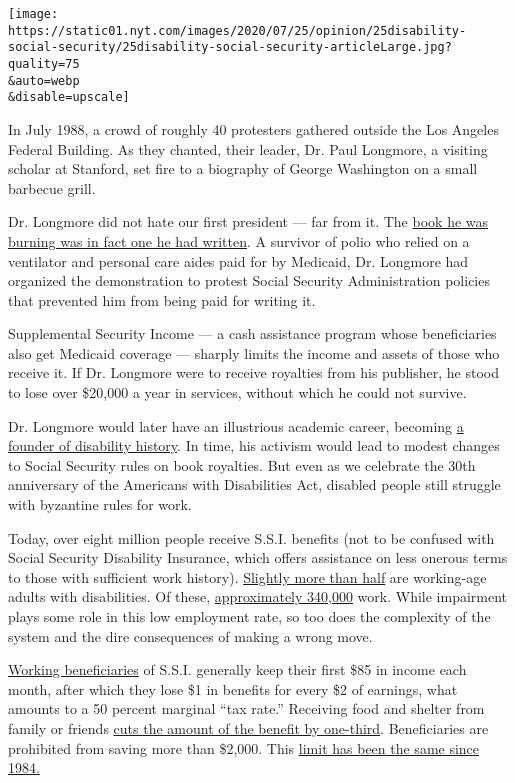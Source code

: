 \texttt{[image: https://static01.nyt.com/images/2020/07/25/opinion/25disability-social-security/25disability-social-security-articleLarge.jpg?quality=75\\\&auto=webp\\\&disable=upscale]}

In July 1988, a crowd of roughly 40 protesters gathered outside the Los
Angeles Federal Building. As they chanted, their leader, Dr. Paul
Longmore, a visiting scholar at Stanford, set fire to a biography of
George Washington on a small barbecue grill.

Dr. Longmore did not hate our first president --- far from it. The
\href{https://www.npr.org/sections/health-shots/2010/08/11/129127432/paul-longmore-historian-and-advocate-for-disabled-dies}{book
he was burning was in fact one he had written}. A survivor of polio who
relied on a ventilator and personal care aides paid for by Medicaid, Dr.
Longmore had organized the demonstration to protest Social Security
Administration policies that prevented him from being paid for writing
it.

Supplemental Security Income --- a cash assistance program whose
beneficiaries also get Medicaid coverage --- sharply limits the income
and assets of those who receive it. If Dr. Longmore were to receive
royalties from his publisher, he stood to lose over \$20,000 a year in
services, without which he could not survive.

Dr. Longmore would later have an illustrious academic career, becoming
\href{https://longmoreinstitute.sfsu.edu/paul-k-longmore}{a founder of
disability history}. In time, his activism would lead to modest changes
to Social Security rules on book royalties. But even as we celebrate the
30th anniversary of the Americans with Disabilities Act, disabled people
still struggle with byzantine rules for work.

Today, over eight million people receive S.S.I. benefits (not to be
confused with Social Security Disability Insurance, which offers
assistance on less onerous terms to those with sufficient work history).
\href{https://www.ssa.gov/policy/docs/statcomps/ssi_monthly/2020-06/table02.html}{Slightly
more than half} are working-age adults with disabilities. Of these,
\href{https://www.ssa.gov/policy/docs/statcomps/ssi_asr/2018/sect07.html\#_blank}{approximately
340,000} work. While impairment plays some role in this low employment
rate, so too does the complexity of the system and the dire consequences
of making a wrong move.

\href{https://www.ssa.gov/pubs/EN-05-10095.pdf}{Working beneficiaries}
of S.S.I. generally keep their first \$85 in income each month, after
which they lose \$1 in benefits for every \$2 of earnings, what amounts
to a 50 percent marginal ``tax rate.'' Receiving food and shelter from
family or friends
\href{https://www.ssa.gov/ssi/text-living-ussi.htm\#_blank}{cuts the
amount of the benefit by one-third}. Beneficiaries are prohibited from
saving more than \$2,000. This
\href{https://www.ssa.gov/policy/docs/chartbooks/disability_trends/sect05.html}{limit
has been the same since 1984.}

